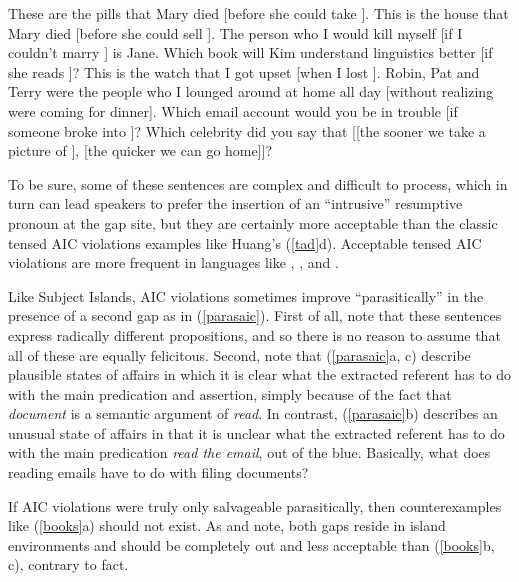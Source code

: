 \documentclass[output=paper,biblatex,babelshorthands,newtxmath,draftmode,colorlinks,citecolor=brown]{langscibook}
\begin{document}
 

\ealnoraggedright
\label{gr}
\ex These are the pills that Mary died [before she could take \spc].
\ex This is the house that Mary died [before she could sell \spc].
\ex The person who I would kill myself [if I couldn't marry \spc] is Jane.
\ex Which book  will Kim understand linguistics better [if she reads \spc]?
\ex This is the watch that I got upset [when I lost \spc].
\ex Robin, Pat and Terry were the people who I lounged around at home all day [without realizing were \spcs coming for dinner].
\ex Which email account would you be in trouble [if someone broke into \spc]?
\ex Which celebrity did you say that [[the sooner we take a picture of \spc ], [the quicker we can go home]]?
\zl

\noindent 
To be sure, some of these sentences are complex and difficult to process, which in turn can lead
speakers to prefer the insertion of an ``intrusive'' resumptive pronoun at the gap site, but they
are certainly more acceptable than the classic tensed AIC violations examples like Huang's
(\ref{tad}d).  Acceptable tensed AIC violations are more frequent in languages like ,
, and .

Like Subject Islands, AIC violations sometimes improve ``parasitically'' in the presence of a second
gap as in (\ref{parasaic}). First of all, note that these sentences express radically different
propositions, and so there is no reason to assume that all of these are equally felicitous.  Second,
note that (\ref{parasaic}a, c) describe plausible states of affairs in which it is clear what the
extracted referent has to do with the main predication and assertion, simply because of the fact
that \emph{document} is a semantic argument of \emph{read}.  In contrast, (\ref{parasaic}b)
describes an unusual state of affairs in that it is unclear what the extracted referent has to do
with the main predication \emph{read the email}, out of the blue. Basically, what does reading
emails have to do with filing documents?

\eal \label{parasaic}
\zl

\noindent
If AIC violations were truly only salvageable parasitically, then counterexamples like
(\ref{books}a) should not exist.  As \citet{Levine:Sag:03} and \citet[256]{levhubook} note, both
gaps reside in island environments and should be completely out and less acceptable than
(\ref{books}b, c), contrary to fact.
\end{document}
